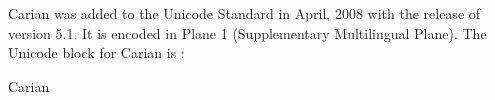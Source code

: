 Carian was added to the Unicode Standard in April, 2008 with the release of version 5.1. It is encoded in Plane 1 (Supplementary Multilingual Plane).
The Unicode block for Carian is :

\begin{scriptexample}[]{Carian}
\end{scriptexample}





